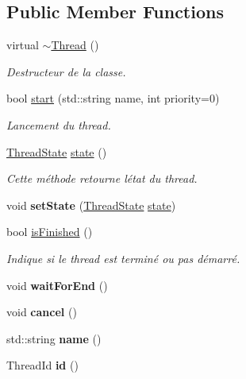 \subsection*{Public Member Functions}
\begin{DoxyCompactItemize}
\item 
\mbox{\label{classutils_1_1Thread_aea8daf2decfe3206f7ce6f89e7eb0569}} 
virtual \hyperlink{classutils_1_1Thread_aea8daf2decfe3206f7ce6f89e7eb0569}{$\sim$\+Thread} ()
\begin{DoxyCompactList}\small\item\em Destructeur de la classe. \end{DoxyCompactList}\item 
bool \hyperlink{classutils_1_1Thread_a430ee2b8962147b587157fac97932219}{start} (std\+::string name, int priority=0)
\begin{DoxyCompactList}\small\item\em Lancement du thread. \end{DoxyCompactList}\item 
\hyperlink{Thread_8hpp_a504e3834817aefe4aa5d0403791dd269}{Thread\+State} \hyperlink{classutils_1_1Thread_ada9233f3e669c925e9ed518201ad31cd}{state} ()
\begin{DoxyCompactList}\small\item\em Cette méthode retourne l\textquotesingle{}état du thread. \end{DoxyCompactList}\item 
\mbox{\label{classutils_1_1Thread_a46589324e8fc0735c20268db70d34aa5}} 
void {\bfseries set\+State} (\hyperlink{Thread_8hpp_a504e3834817aefe4aa5d0403791dd269}{Thread\+State} \hyperlink{classutils_1_1Thread_ada9233f3e669c925e9ed518201ad31cd}{state})
\item 
bool \hyperlink{classutils_1_1Thread_acc5214a88eab5c3bd421e7ee06f66b1a}{is\+Finished} ()
\begin{DoxyCompactList}\small\item\em Indique si le thread est terminé ou pas démarré. \end{DoxyCompactList}\item 
\mbox{\label{classutils_1_1Thread_a29b8cb62f6b5f80ffe5b050167780f97}} 
void {\bfseries wait\+For\+End} ()
\item 
\mbox{\label{classutils_1_1Thread_ac7174393a61b12f962bfacef078bf43e}} 
void {\bfseries cancel} ()
\item 
\mbox{\label{classutils_1_1Thread_a48b51d705e5e07f19f4acc17c6fc5411}} 
std\+::string {\bfseries name} ()
\item 
\mbox{\label{classutils_1_1Thread_ab3ecfb3efec3bb3d24d82de3fa5d1645}} 
Thread\+Id {\bfseries id} ()
\end{DoxyCompactItemize}
